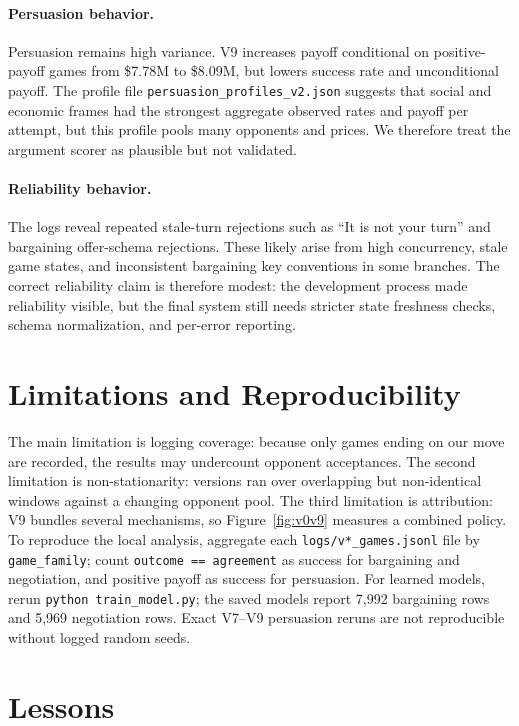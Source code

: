 \documentclass{article}
\begin{document}
\paragraph{Persuasion behavior.}
Persuasion remains high variance. V9 increases payoff conditional on positive-payoff games from \$7.78M to \$8.09M, but lowers success rate and unconditional payoff. The profile file \texttt{persuasion\_profiles\_v2.json} suggests that social and economic frames had the strongest aggregate observed rates and payoff per attempt, but this profile pools many opponents and prices. We therefore treat the argument scorer as plausible but not validated.

\paragraph{Reliability behavior.}
The logs reveal repeated stale-turn rejections such as ``It is not your turn'' and bargaining offer-schema rejections. These likely arise from high concurrency, stale game states, and inconsistent bargaining key conventions in some branches. The correct reliability claim is therefore modest: the development process made reliability visible, but the final system still needs stricter state freshness checks, schema normalization, and per-error reporting.

\section{Limitations and Reproducibility}

The main limitation is logging coverage: because only games ending on our move are recorded, the results may undercount opponent acceptances. The second limitation is non-stationarity: versions ran over overlapping but non-identical windows against a changing opponent pool. The third limitation is attribution: V9 bundles several mechanisms, so Figure~\ref{fig:v0v9} measures a combined policy. To reproduce the local analysis, aggregate each \texttt{logs/v*\_games.jsonl} file by \texttt{game\_family}; count \texttt{outcome == agreement} as success for bargaining and negotiation, and positive payoff as success for persuasion. For learned models, rerun \texttt{python train\_model.py}; the saved models report 7,992 bargaining rows and 5,969 negotiation rows. Exact V7--V9 persuasion reruns are not reproducible without logged random seeds.

\section{Lessons}
\end{document}
